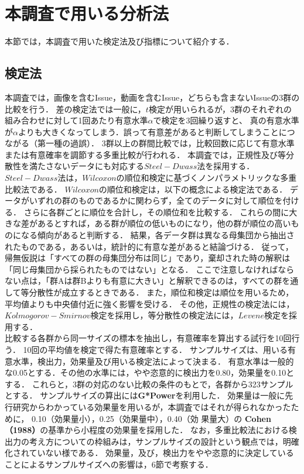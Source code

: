 \section{本調査で用いる分析法\label{method}}
本節では，本調査で用いた検定法及び指標について紹介する．

\subsection{検定法}
本調査では，画像を含むIssue，動画を含むIssue，どちらも含まないIssueの3群の比較を行う．
差の検定法では一般に，$t$検定が用いられるが，3群のそれぞれの組み合わせに対して1回あたり有意水準$\alpha$で検定を3回繰り返すと、
真の有意水準が$\alpha$よりも大きくなってしまう．誤って有意差があると判断してしまうことにつながる（第一種の過誤）．
3群以上の群間比較では，比較回数に応じて有意水準または有意確率を調節する多重比較が行われる．
本調査では，正規性及び等分散性を満たさないデータにも対応する$Steel-Dwass$法を採用する．
$Steel-Dwass$法は，$Wilcoxon$の順位和検定に基づくノンパラメトリックな多重比較法である．
$Wilcoxon$の順位和検定は，以下の概念による検定法である．
データがいずれの群のものであるかに関わらず，全てのデータに対して順位を付ける．
さらに各群ごとに順位を合計し，その順位和を比較する．
これらの間に大きな差があるとすれば，ある群が順位の低いものになり，他の群が順位の高いものになる傾向があると判断する．
結果，各データ群は異なる母集団から抽出されたものである，あるいは，統計的に有意な差があると結論づける．
従って，帰無仮説は「すべての群の母集団分布は同じ」であり，棄却された時の解釈は「同じ母集団から採られたものではない」となる．
ここで注意しなければならない点は，「群Aは群Bよりも有意に大きい」と解釈できるのは，すべての群を通して等分散性が成立するときである．\cite{Interpretation_For_Nonparametric_Test}
また，順位和検定は順位を用いるため，平均値よりも中央値付近に強く影響を受ける．
その他，正規性の検定法には，$Kolmogorov-Smirnov$検定を採用し，等分散性の検定法には，$Levene$検定を採用する．
\\
比較する各群から同一サイズの標本を抽出し，有意確率を算出する試行を10回行う．
10回の平均値を検定で得た有意確率とする．
サンプルサイズは、用いる有意水準，検出力，効果量及び用いる検定法によって決まる．
有意水準は一般的な0.05とする．その他の水準には，やや恣意的に検出力を0.80，効果量を0.10とする．
これらと，3群の対応のない比較の条件のもとで，各群から323サンプルとする．
サンプルサイズの算出には\textbf{G*Power}\cite{G*Power1}\cite{G*Power2}を利用した．
効果量は一般に先行研究からわかっている効果量を用いるが，本調査ではそれが得られなかったために， 0.10（効果量小），0.25（効果量中），0.40（効
果量大）の \textbf{Cohen（1988）}の基準から小程度の効果量を採用した．
なお，多重比較法における検出力の考え方についての枠組みは，サンプルサイズの設計という観点では，明確化されていない様である．\cite{Test_Power}
効果量，及び，検出力をやや恣意的に決定していることによるサンプルサイズへの影響は，6節で考察する．


